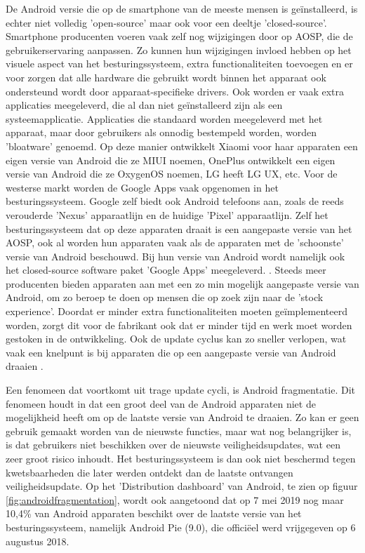 De Android versie die op de smartphone van de meeste mensen is geïnstalleerd, is echter niet volledig 'open-source' maar ook voor een deeltje 'closed-source'. Smartphone producenten voeren vaak zelf nog wijzigingen door op AOSP, die de gebruikerservaring aanpassen. Zo kunnen hun wijzigingen invloed hebben op het visuele aspect van het besturingssysteem, extra functionaliteiten toevoegen en er voor zorgen dat alle hardware die gebruikt wordt binnen het apparaat ook ondersteund wordt door apparaat-specifieke drivers. Ook worden er vaak extra applicaties meegeleverd, die al dan niet geïnstalleerd zijn als een systeemapplicatie. Applicaties die standaard worden meegeleverd met het apparaat, maar door gebruikers als onnodig bestempeld worden, worden 'bloatware' genoemd. Op deze manier ontwikkelt Xiaomi voor haar apparaten een eigen versie van Android die ze MIUI noemen, OnePlus ontwikkelt een eigen versie van Android die ze OxygenOS noemen, LG heeft LG UX, etc. Voor de westerse markt worden de Google Apps vaak opgenomen in het besturingssysteem. Google zelf biedt ook Android telefoons aan, zoals de reeds verouderde 'Nexus' apparaatlijn en de huidige 'Pixel' apparaatlijn. Zelf het besturingssysteem dat op deze apparaten draait is een aangepaste versie van het AOSP, ook al worden hun apparaten vaak als de apparaten met de 'schoonste' versie van Android beschouwd. Bij hun versie van Android wordt namelijk ook het closed-source software paket 'Google Apps' meegeleverd. \autocite{torres_stockandroid}. Steeds meer producenten bieden apparaten aan met een zo min mogelijk aangepaste versie van Android, om zo beroep te doen op mensen die op zoek zijn naar de 'stock experience'. Doordat er minder extra functionaliteiten moeten geïmplementeerd worden, zorgt dit voor de fabrikant ook dat er minder tijd en werk moet worden gestoken in de ontwikkeling. Ook de update cyclus kan zo sneller verlopen, wat vaak een knelpunt is bij apparaten die op een aangepaste versie van Android draaien \autocite{manik_slow-updates}. 

Een fenomeen dat voortkomt uit trage update cycli, is Android fragmentatie. Dit fenomeen houdt in dat een groot deel van de Android apparaten niet de mogelijkheid heeft om op de laatste versie van Android te draaien. Zo kan er geen gebruik gemaakt worden van de nieuwste functies, maar wat nog belangrijker is, is dat gebruikers niet beschikken over de nieuwste veiligheidsupdates, wat een zeer groot risico inhoudt. Het besturingssysteem is dan ook niet beschermd tegen kwetsbaarheden die later werden ontdekt dan de laatste ontvangen veiligheidsupdate. Op het 'Distribution dashboard' van Android, te zien op figuur \ref{fig:androidfragmentation}, wordt ook aangetoond dat op 7 mei 2019 nog maar 10,4\% van Android apparaten beschikt over de laatste versie van het besturingssysteem, namelijk Android Pie (9.0), die officiëel werd vrijgegeven op 6 augustus 2018.

